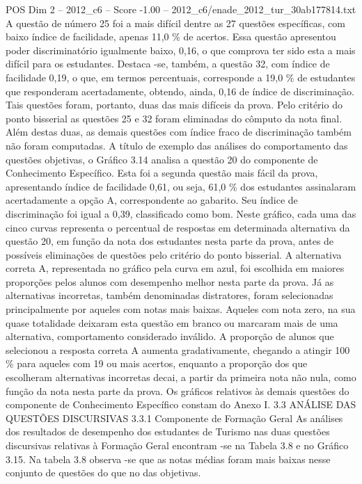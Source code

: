 \begin{textsample}{POS Dim 2 – 2012\_c6 – Score -1.00 – 2012\_c6/enade\_2012\_tur\_30ab177814.txt}
A questão de número 25 foi a mais difícil dentre as 27 questões específicas, com baixo índice de facilidade, apenas 11,0 \% de acertos.
Essa questão apresentou poder discriminatório igualmente baixo, 0,16, o que comprova ter sido esta a mais difícil para os estudantes.
Destaca -se, também, a questão 32, com índice de facilidade 0,19, o que, em termos percentuais, corresponde a 19,0 \% de estudantes que responderam acertadamente, obtendo, ainda, 0,16 de índice de discriminação.
Tais questões foram, portanto, duas das mais difíceis da prova.
Pelo critério do ponto bisserial as questões 25 e 32 foram eliminadas do cômputo da nota final.
Além destas duas, as demais questões com índice fraco de discriminação também não foram computadas.
A título de exemplo das análises do comportamento das questões objetivas, o Gráfico 3.14 analisa a questão 20 do componente de Conhecimento Específico.
Esta foi a segunda questão mais fácil da prova, apresentando índice de facilidade 0,61, ou seja, 61,0 \% dos estudantes assinalaram acertadamente a opção A, correspondente ao gabarito.
Seu índice de discriminação foi igual a 0,39, classificado como bom.
Neste gráfico, cada uma das cinco curvas representa o percentual de respostas em determinada alternativa da questão 20, em função da nota dos estudantes nesta parte da prova, antes de possíveis eliminações de questões pelo critério do ponto bisserial.
A alternativa correta A, representada no gráfico pela curva em azul, foi escolhida em maiores proporções pelos alunos com desempenho melhor nesta parte da prova.
Já as alternativas incorretas, também denominadas distratores, foram selecionadas principalmente por aqueles com notas mais baixas.
Aqueles com nota zero, na sua quase totalidade deixaram esta questão em branco ou marcaram mais de uma alternativa, comportamento considerado inválido.
A proporção de alunos que selecionou a resposta correta A aumenta gradativamente, chegando a atingir 100 \% para aqueles com 19 ou mais acertos, enquanto a proporção dos que escolheram alternativas incorretas decai, a partir da primeira nota não nula, como função da nota nesta parte da prova.
Os gráficos relativos às demais questões do componente de Conhecimento Específico constam do Anexo I. 3.3 ANÁLISE DAS QUESTÕES DISCURSIVAS 3.3.1 Componente de Formação Geral As análises dos resultados de desempenho dos estudantes de Turismo nas duas questões discursivas relativas à Formação Geral encontram -se na Tabela 3.8 e no Gráfico 3.15.
Na tabela 3.8 observa -se que as notas médias foram mais baixas nesse conjunto de questões do que no das objetivas.

\end{textsample}
